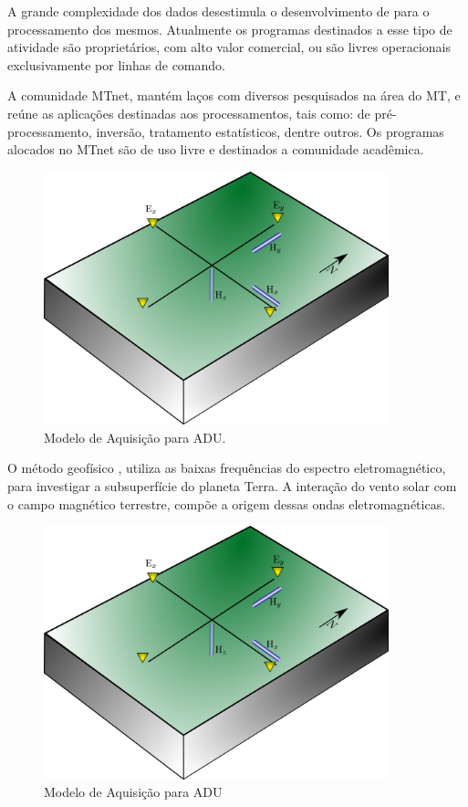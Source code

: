 \documentclass[12pt,twoside,oneright,a4paper,chapter=TITLE,english,brazil]{unipampa}
\begin{document}
    A grande complexidade dos dados desestimula o desenvolvimento de para o processamento dos mesmos. Atualmente os programas destinados a esse tipo de atividade são proprietários,\cite{cagniard1953basic} com alto valor comercial, ou são livres operacionais exclusivamente por linhas de comando.  
    
    A comunidade MTnet, mantém laços com diversos pesquisados na área do MT, e reúne as aplicações destinadas aos processamentos, tais como:  de pré-processamento, inversão, tratamento estatísticos, dentre outros. Os programas alocados no MTnet são de uso livre e destinados a comunidade acadêmica.
    
    \begin{figure}[H]
        \caption{Modelo de Aquisição para ADU.}
        \begin{center}
         \includegraphics[width=10cm]{fig/ADU_MODELO.png}
        \end{center}
        \legend{\Fonte{\oautor}}
    \end{figure}
     O método geofísico , utiliza as baixas frequências do espectro eletromagnético, para investigar a subsuperfície do planeta Terra. A interação do vento solar com o campo magnético terrestre, compõe a origem dessas ondas eletromagnéticas.
     
     \begin{figure}[htp]
        \caption{Modelo de Aquisição para ADU}
        \begin{center}
         \includegraphics[width=10cm]{fig/ADU_MODELO.png}
        \end{center}
        \legend{\Fonte{\oautor}}
    \end{figure}
\end{document}
